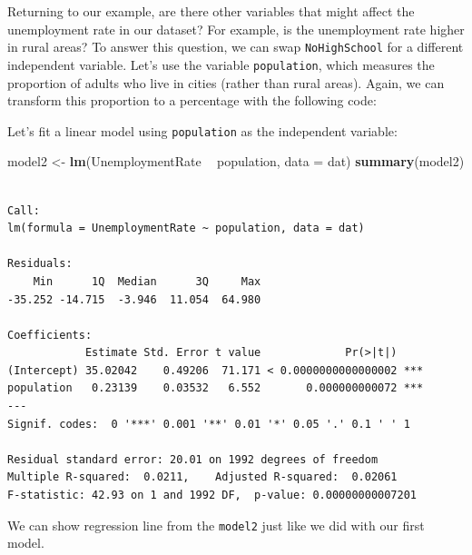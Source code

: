 \documentclass[]{article}
\newenvironment{Shaded}{\begin{snugshade}}{\end{snugshade}}
\newcommand{\KeywordTok}[1]{\textcolor[rgb]{0.13,0.29,0.53}{\textbf{#1}}}
\newcommand{\DataTypeTok}[1]{\textcolor[rgb]{0.13,0.29,0.53}{#1}}
\newcommand{\DecValTok}[1]{\textcolor[rgb]{0.00,0.00,0.81}{#1}}
\newcommand{\StringTok}[1]{\textcolor[rgb]{0.31,0.60,0.02}{#1}}
\newcommand{\OperatorTok}[1]{\textcolor[rgb]{0.81,0.36,0.00}{\textbf{#1}}}
\newcommand{\NormalTok}[1]{#1}
\theoremstyle{definition}
\theoremstyle{definition}
\theoremstyle{definition}
\theoremstyle{remark}
\begin{document}
Returning to our example, are there other variables that might affect
the unemployment rate in our dataset? For example, is the unemployment
rate higher in rural areas? To answer this question, we can swap
\texttt{NoHighSchool} for a different independent variable. Let's use
the variable \texttt{population}, which measures the proportion of
adults who live in cities (rather than rural areas). Again, we can
transform this proportion to a percentage with the following code:

\begin{Shaded}
\end{Shaded}

Let's fit a linear model using \texttt{population} as the independent
variable:

\begin{Shaded}
\begin{Highlighting}[]
\NormalTok{model2 <-}\StringTok{ }\KeywordTok{lm}\NormalTok{(UnemploymentRate }\OperatorTok{~}\StringTok{ }\NormalTok{population, }\DataTypeTok{data =}\NormalTok{ dat)}
\KeywordTok{summary}\NormalTok{(model2)}
\end{Highlighting}
\end{Shaded}

\begin{verbatim}

Call:
lm(formula = UnemploymentRate ~ population, data = dat)

Residuals:
    Min      1Q  Median      3Q     Max 
-35.252 -14.715  -3.946  11.054  64.980 

Coefficients:
            Estimate Std. Error t value             Pr(>|t|)    
(Intercept) 35.02042    0.49206  71.171 < 0.0000000000000002 ***
population   0.23139    0.03532   6.552       0.000000000072 ***
---
Signif. codes:  0 '***' 0.001 '**' 0.01 '*' 0.05 '.' 0.1 ' ' 1

Residual standard error: 20.01 on 1992 degrees of freedom
Multiple R-squared:  0.0211,    Adjusted R-squared:  0.02061 
F-statistic: 42.93 on 1 and 1992 DF,  p-value: 0.00000000007201
\end{verbatim}

We can show regression line from the \texttt{model2} just like we did
with our first model.
\end{document}
